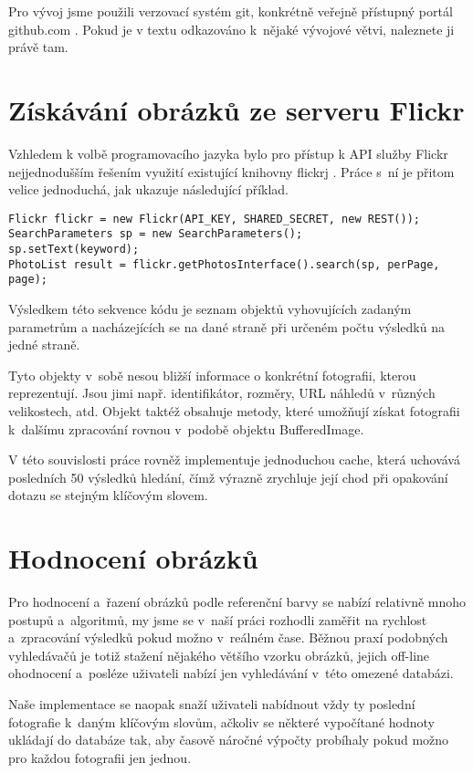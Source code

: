 \documentclass[12pt,oneside,a4paper]{article}
\newenvironment{listing}
{\begin{list}{}{\setlength{\leftmargin}{1em}}\item\scriptsize\bfseries}
{\end{list}}
\begin{document}
Pro vývoj jsme použili verzovací systém git, konkrétně veřejně přístupný portál github.com \cite{official}. Pokud je v textu odkazováno k~nějaké vývojové větvi, naleznete ji právě tam.

\section{Získávání obrázků ze serveru Flickr}
Vzhledem k volbě programovacího jazyka bylo pro přístup k API služby Flickr nejjednodušším řešením využití existující knihovny flickrj \cite{flickrj}. Práce s~ní je přitom velice jednoduchá, jak ukazuje následující příklad.

\begin{listing}
\begin{verbatim}
Flickr flickr = new Flickr(API_KEY, SHARED_SECRET, new REST());
SearchParameters sp = new SearchParameters();
sp.setText(keyword);
PhotoList result = flickr.getPhotosInterface().search(sp, perPage, page);
\end{verbatim}
\end{listing}

Výsledkem této sekvence kódu je seznam objektů vyhovujících zadaným parametrům a nacházejících se na dané straně při určeném počtu výsledků na jedné straně.

Tyto objekty v~sobě nesou bližší informace o konkrétní fotografii, kterou reprezentují. Jsou jimi např. identifikátor, rozměry, URL náhledů v~různých velikostech, atd. Objekt taktéž obsahuje metody, které umožňují získat fotografii k~dalšímu zpracování rovnou v~podobě objektu BufferedImage.

V této souvislosti práce rovněž implementuje jednoduchou cache, která uchovává posledních 50 výsledků hledání, čímž výrazně zrychluje její chod při opakování dotazu se stejným klíčovým slovem.

\section{Hodnocení obrázků}
Pro hodnocení a~řazení obrázků podle referenční barvy se nabízí relativně mnoho postupů a~algoritmů, my jsme se v~naší práci rozhodli zaměřit na rychlost a~zpracování výsledků pokud možno v~reálném čase. Běžnou praxí podobných vyhledávačů je totiž stažení nějakého většího vzorku obrázků, jejich off-line ohodnocení a~posléze uživateli nabízí jen vyhledávání v~této omezené databázi.

Naše implementace se naopak snaží uživateli nabídnout vždy ty poslední fotografie k~daným klíčovým slovům, ačkoliv se některé vypočítané hodnoty ukládají do databáze tak, aby časově náročné výpočty probíhaly pokud možno pro každou fotografii jen jednou.
\end{document}

